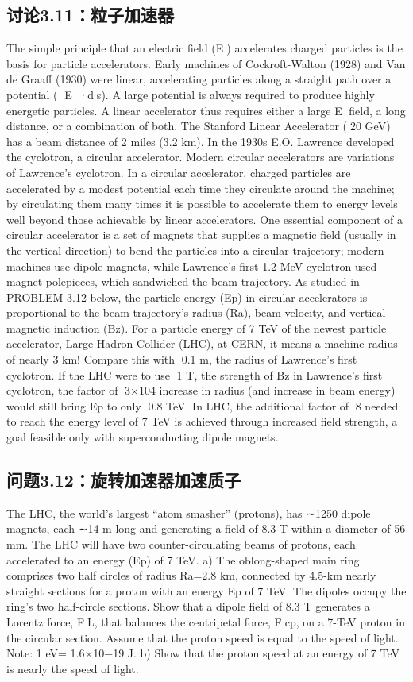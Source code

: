 \subsection{讨论3.11：粒子加速器}
The simple principle that an electric field (E) accelerates charged particles is the
basis for particle accelerators. Early machines of Cockroft-Walton (1928) and Van
de Graaff (1930) were linear, accelerating particles along a straight path over a
potential ( E ·ds). A large potential is always required to produce highly energetic
particles. A linear accelerator thus requires either a large E field, a long distance,
or a combination of both. The Stanford Linear Accelerator (∼20 GeV) has a beam
distance of 2 miles (3.2 km).
In the 1930s E.O. Lawrence developed the cyclotron, a circular accelerator. Modern circular accelerators are variations of Lawrence’s cyclotron. In a circular accelerator, charged particles are accelerated by a modest potential each time they
circulate around the machine; by circulating them many times it is possible to accelerate them to energy levels well beyond those achievable by linear accelerators.
One essential component of a circular accelerator is a set of magnets that supplies
a magnetic field (usually in the vertical direction) to bend the particles into a
circular trajectory; modern machines use dipole magnets, while Lawrence’s first
1.2-MeV cyclotron used magnet polepieces, which sandwiched the beam trajectory.
As studied in PROBLEM 3.12 below, the particle energy (Ep) in circular accelerators is proportional to the beam trajectory’s radius (Ra), beam velocity, and
vertical magnetic induction (Bz). For a particle energy of 7 TeV of the newest
particle accelerator, Large Hadron Collider (LHC), at CERN, it means a machine
radius of nearly 3 km! Compare this with ∼0.1 m, the radius of Lawrence’s first
cyclotron. If the LHC were to use ∼1 T, the strength of Bz in Lawrence’s first
cyclotron, the factor of ∼3×104 increase in radius (and increase in beam energy)
would still bring Ep to only ∼0.8 TeV. In LHC, the additional factor of ∼8 needed
to reach the energy level of 7 TeV is achieved through increased field strength, a
goal feasible only with superconducting dipole magnets.
\newpage


\subsection{问题3.12：旋转加速器加速质子}
The LHC, the world’s largest “atom smasher” (protons), has ∼1250 dipole magnets, each ∼14 m long and generating a field of 8.3 T within a diameter of 56 mm.
The LHC will have two counter-circulating beams of protons, each accelerated to
an energy (Ep) of 7 TeV.
a) The oblong-shaped main ring comprises two half circles of radius Ra=2.8 km,
connected by 4.5-km nearly straight sections for a proton with an energy
Ep
of 7 TeV. The dipoles occupy the ring’s two half-circle sections. Show
that a dipole field of 8.3 T generates a Lorentz force, FL, that balances the
centripetal force, Fcp, on a 7-TeV proton in the circular section. Assume that
the proton speed is equal to the speed of light. Note: 1 eV= 1.6×10−19 J.
b) Show that the proton speed at an energy of 7 TeV is nearly the speed of light.

